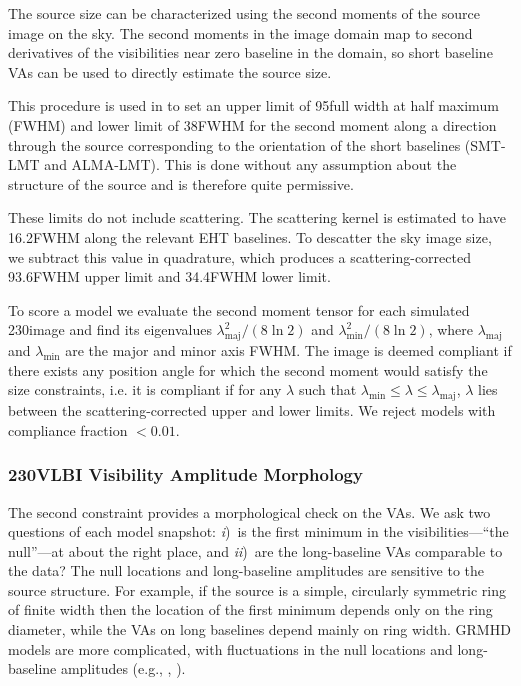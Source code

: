 The source size can be characterized using the second moments of the
source image on the sky.
The second moments in the image domain map to second derivatives of
the visibilities near zero baseline in the \uv domain, so short
baseline VAs can be used to directly estimate the source size.

This procedure is used in  to set an upper limit
of 95\uas full width at half maximum (FWHM) and lower limit of 38\uas FWHM for the second moment along a direction
through the source corresponding to the orientation of the short
baselines (SMT-LMT and ALMA-LMT). This is done without any assumption about the structure of the source and is therefore quite permissive.

These limits do not include scattering.  The scattering kernel is estimated to have 16.2\uas FWHM along the relevant EHT baselines. To descatter the sky image size, we subtract this value in quadrature, which produces a scattering-corrected 93.6\uas FWHM upper limit and 34.4\uas FWHM lower limit.

To score a model we evaluate the second moment tensor for each
simulated 230\GHz image and find its eigenvalues
$\lambda_\mathrm{maj}^2/(8\ln 2)$ and $\lambda_\mathrm{min}^2/(8\ln
2)$, where $\lambda_\mathrm{maj}$ and $\lambda_\mathrm{min}$ are the
major and minor axis FWHM.
The image is deemed compliant if there exists any position angle for which the second moment would satisfy the size constraints, i.e. it is compliant if for any $\lambda$ such that $\lambda_\mathrm{min} \le \lambda \le \lambda_\mathrm{maj}$, $\lambda$ lies between the scattering-corrected upper and lower limits.  
We reject models with compliance fraction $< 0.01$.

\subsubsection{230\GHz VLBI Visibility Amplitude Morphology}

The second constraint provides a morphological check on the VAs.
We ask two questions of each model snapshot:
\emph{i})~is the first minimum in the visibilities---``the null''---at about the right place, and
\emph{ii})~are the long-baseline VAs comparable to the data?
The null locations and long-baseline amplitudes are sensitive to
the source structure.
For example, if the source is a simple, circularly symmetric ring of
finite width then the location of the first minimum depends only on
the ring diameter, while the VAs on long baselines depend mainly on
ring width.
GRMHD models are more complicated, with fluctuations in the null locations and long-baseline amplitudes (e.g., \citealt{2018ApJ...856..163M}, ).

